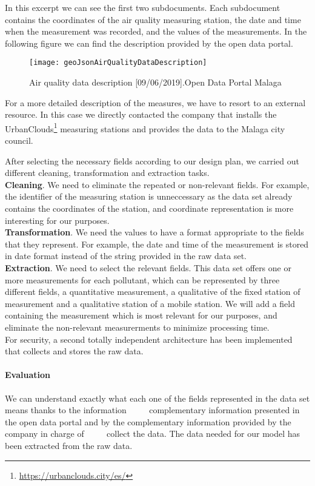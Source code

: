     In this excerpt we can see the first two subdocuments. Each subdocument contains the coordinates of the air quality measuring station, the date and time when the measurement was recorded, and the values of the measurements.
    In the following figure we can find the description provided by the open data portal.
\begin{figure}[ht]
    \centering
    \texttt{[image: geoJsonAirQualityDataDescription]}
    \caption{Air quality data description [09/06/2019].Open Data Portal Malaga}
\end{figure}


For a more detailed description of the measures, we have to resort to an external resource. In this case we directly contacted 
the company that installs the UrbanClouds\footnote{\url{https://urbanclouds.city/es/}} measuring stations and provides the data to the Malaga city council.

After selecting the necessary fields according to our design plan, we carried out different cleaning, transformation and extraction tasks. \\


\textbf{Cleaning}. We need to eliminate the repeated or non-relevant fields. For example, the identifier of the measuring station is  unneccessary as the data set already contains the coordinates of the station, and coordinate representation is more interesting for our purposes. \\

\textbf{Transformation}. We need the values to have a format appropriate to the fields that they represent. For example, the date and time of the measurement is stored in date format
instead of the string provided in the raw data set. \\

\textbf{Extraction}. We need to select the relevant fields. This data set offers one or more measurements for each pollutant, which can be represented by three different fields, a
quantitative measurement, a qualitative of the fixed station of measurement and a qualitative station of a mobile station. We will add a field containing the measurement which is most relevant for our purposes, and eliminate the non-relevant measurerments to minimize processing time. \\

For security, a second totally independent architecture has been implemented that collects and stores the raw data.

\paragraph{Evaluation} \mbox{} 
\begin{itemize}
    \done We can understand exactly what each one of the fields represented in the data set means thanks to the information
         complementary information presented in the open data portal and by the complementary information provided by the company in charge of
         collect the data.
    \done The data needed for our model has been extracted from the raw data.
    
\end{itemize}
\newpage
